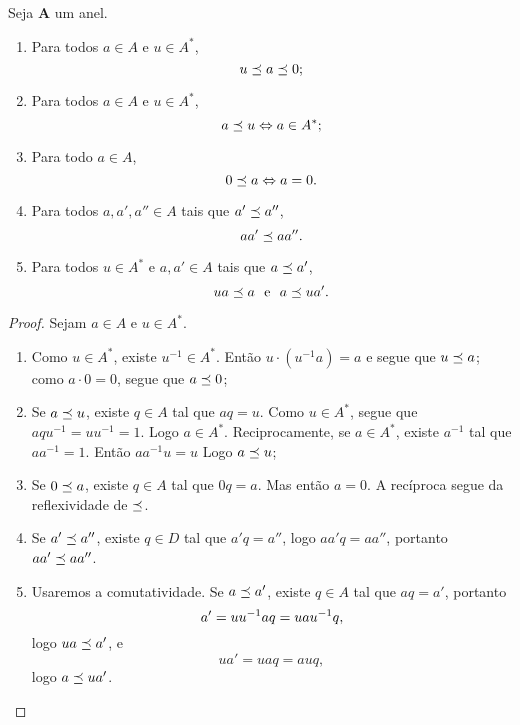 \begin{proposition}
Seja $\bm A$ um anel.
	\begin{enumerate}
	\item Para todos $a \in A$ e $u \in A^*$,
		\begin{equation*}
		u \preceq a \preceq 0;
		\end{equation*}
	\item Para todos $a \in A$ e $u \in A^*$,
		\begin{equation*}
		a \preceq u \Leftrightarrow a \in A^*;
		\end{equation*}
	\item Para todo $a \in A$,
		\begin{equation*}
		0 \preceq a \Leftrightarrow a=0.
		\end{equation*}
	\item Para todos $a,a',a'' \in A$ tais que $a' \preceq a''$,
		\begin{equation*}
		aa' \preceq aa''.
		\end{equation*}
	\item Para todos $u \in A^*$ e $a,a' \in A$ tais que $a \preceq a'$,
		\begin{equation*}
		ua \preceq a \text{\ \ e\ \ } a \preceq ua'.
		\end{equation*}
	\end{enumerate}
\end{proposition}
\begin{proof} Sejam $a \in A$ e $u \in A^*$.
	\begin{enumerate}
	\item Como $u \in A^*$, existe $u^{-1} \in A^*$. Então $u\cdot(u^{-1}a) = a$ e segue que $u \preceq a$; como $a \cdot 0 = 0$, segue que $a \preceq 0$;
	\item Se $a \preceq u$, existe $q \in A$ tal que $aq=u$. Como $u \in A^*$, segue que $aqu^{-1}=uu^{-1}=1$. Logo $a \in A^*$. Reciprocamente, se $a \in A^*$, existe $a^{-1}$ tal que $aa^{-1}=1$. Então $aa^{-1}u=u$ Logo $a \preceq u$;
	\item Se $0 \preceq a$, existe $q \in A$ tal que $0q=a$. Mas então $a=0$. A recíproca segue da reflexividade de $\preceq$.
	\item Se $a' \preceq a''$, existe $q \in D$ tal que $a'q=a''$, logo $aa'q=aa''$, portanto $aa' \preceq aa''$.
	\item Usaremos a comutatividade. Se $a \preceq a'$, existe $q \in A$ tal que $aq=a'$, portanto
		\begin{equation*}
		a' = uu^{-1} aq = uau^{-1} q,
		\end{equation*}
logo $ua \preceq a'$, e
		\begin{equation*}
		ua' = uaq = auq,
		\end{equation*}
logo $a \preceq ua'$.
	 \qedhere
	\end{enumerate}
\end{proof}

